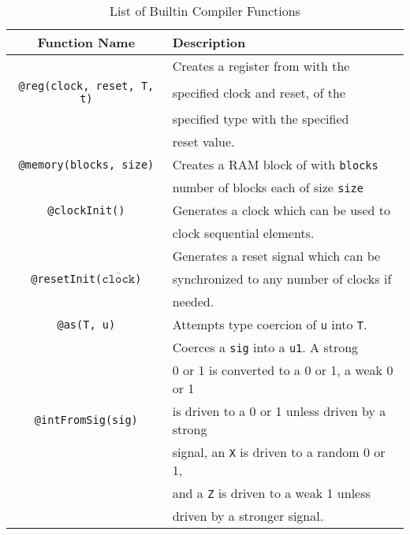 \documentclass[10pt]{article}
\begin{document}
\begin{table}[H]
	\centering
	\begin{tabular}{c|l}
		Function Name                                         & Description                                       \\
		\hline
		                                                      & Creates a register from with the                  \\
		\verb|@reg(clock, reset, T, t)|                       & specified clock and reset, of the                 \\
		                                                      & specified type with the specified                 \\
		                                                      & reset value.                                      \\
		\hline
		\verb|@memory(blocks, size)|                          & Creates a RAM block of with \verb|blocks|         \\
		                                                      & number of blocks each of size \verb|size|         \\
		\hline
		\verb|@clockInit()|                                   & Generates a clock which can be used to            \\
		                                                      & clock sequential elements.                        \\
		\hline
		                                                      & Generates a reset signal which can be             \\
		\verb|@resetInit(|$\overline{\texttt{clock}}$\verb|)| & synchronized to any number of clocks if           \\
		                                                      & needed.                                           \\
		\hline
		\verb|@as(T, u)|                                      & Attempts type coercion of \verb|u| into \verb|T|. \\
		\hline
		                                                      & Coerces a \verb|sig| into a \verb|u1|. A strong   \\
		                                                      & 0 or 1 is converted to a 0 or 1, a weak 0 or 1    \\
		\verb|@intFromSig(sig)|                               & is driven to a 0 or 1 unless driven by a strong   \\
		                                                      & signal, an \verb|X| is driven to a random 0 or 1, \\
		                                                      & and a \verb|Z| is driven to a weak 1 unless       \\
		                                                      & driven by a stronger signal.                      \\
		\hline
	\end{tabular}
	\caption{List of Builtin Compiler Functions}
	\label{tab:builtin_table}
\end{table}
\end{document}
